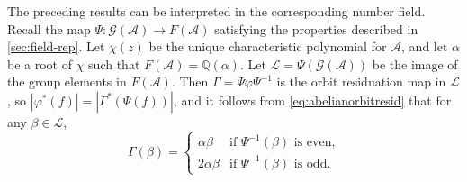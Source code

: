 \documentclass[12pt, letterpaper]{article}
\newcommand{\Q}{\mathbb Q}
\newcommand{\A}{\mathcal A}
\newcommand{\gp}{\mathcal G}
\begin{document}
The preceding results can be interpreted in the corresponding number field.
Recall the map $\Psi : \gp(\A) \rightarrow F(\A)$ satisfying the properties
described in \cref{sec:field-rep}. Let $\chi(z)$ be the unique characteristic
polynomial for $\A$, and let $\alpha$ be a root of $\chi$ such that $F(\A) =
\Q(\alpha)$. Let $\mathcal L = \Psi(\gp(\A))$ be the image of the group
elements in $F(\A)$. Then $\Gamma = \Psi \varphi \Psi^{-1}$ is the orbit
residuation map in $\mathcal L$, so $|\varphi^*(f)| = |\Gamma^*(\Psi(f))|$, and
it follows from \cref{eq:abelianorbitresid} that for any $\beta \in \mathcal
L$,
\[
    \Gamma(\beta) = \begin{cases}
        \alpha \beta & \text{if $\Psi^{-1}(\beta)$ is even,}\\
        2\alpha \beta & \text{if $\Psi^{-1}(\beta)$ is odd.}
    \end{cases}
\]
\end{document}
